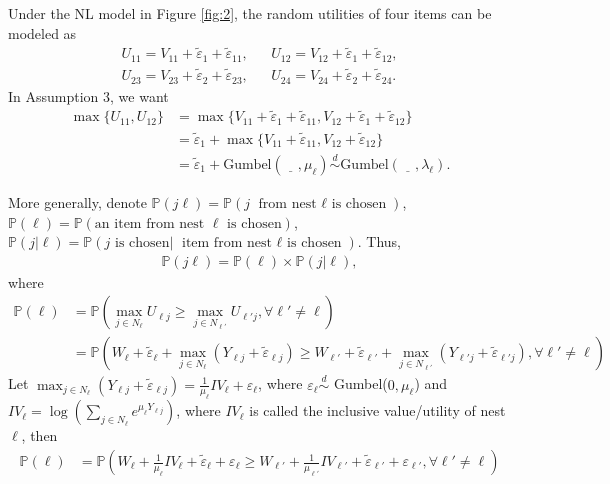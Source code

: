 \documentclass[11pt]{article}
\newcommand{\prob}{\ensuremath{\mathbb{P}}}
\newenvironment{example}[2][Example]{\begin{trivlist}
\item[\hskip \labelsep {\bfseries #1}\hskip \labelsep {\bfseries #2.}]}{\end{trivlist}}
\begin{document}
\begin{example}[Example] 4
Under the NL model in Figure \ref{fig:2}, the random utilities of four items can be modeled as
\begin{align*}
U_{11} = V_{11} + \tilde{\varepsilon}_1 + \tilde{\varepsilon}_{11}, && U_{12} = V_{12} + \tilde{\varepsilon}_1 + \tilde{\varepsilon}_{12},\\
U_{23} = V_{23} + \tilde{\varepsilon}_2 + \tilde{\varepsilon}_{23}, && U_{24} = V_{24} + \tilde{\varepsilon}_2 + \tilde{\varepsilon}_{24}.
\end{align*}
In Assumption 3, we want
\begin{align*}
\max\{U_{11}, U_{12}\} &= \max \{V_{11} + \tilde{\varepsilon}_1 + \tilde{\varepsilon}_{11}, V_{12} + \tilde{\varepsilon}_1 + \tilde{\varepsilon}_{12}\}\\
&= \tilde{\varepsilon}_1 + \max \{V_{11} + \tilde{\varepsilon}_{11}, V_{12} + \tilde{\varepsilon}_{12}\}\\
&= \tilde{\varepsilon}_1 + \text{Gumbel}(\underline{\quad}, \mu_\ell) \overset{d}\sim\text{Gumbel}(\underline{\quad}, \lambda_\ell).
\end{align*}
\end{example}
More generally, denote $\prob(j\ell) = \prob(j \text{ from nest $\ell$ is chosen})$, $\prob(\ell) = \prob(\text{an item from nest $\ell$ is chosen})$, $\prob(j|\ell) = \prob(j \text{ is chosen}|\text{ item from nest $\ell$ is chosen})$. Thus,
\begin{align*}
\prob(j \ell) = \prob(\ell) \times \prob(j|\ell),
\end{align*}
where
\begin{align*}
\prob(\ell) &= \prob(\max_{j \in N_\ell} U_{\ell j} \geq \max_{j \in N_{\ell'}} U_{\ell' j}, \forall \ell' \neq \ell)\\
&= \prob(W_\ell + \tilde{\varepsilon}_\ell + \max_{j \in N_\ell}(Y_{\ell j} + \tilde{\varepsilon}_{\ell j}) \geq W_{\ell'} + \tilde{\varepsilon}_{\ell'} + \max_{j \in N_{\ell'}}(Y_{\ell' j} + \tilde{\varepsilon}_{\ell' j}), \forall \ell' \neq \ell)
\end{align*}
Let $\max_{j \in N_\ell}(Y_{\ell j} + \tilde{\varepsilon}_{\ell j}) = \frac{1}{\mu_\ell} IV_\ell + \varepsilon_\ell$, where $\varepsilon_\ell \overset{d}\sim$ Gumbel($0, \mu_\ell$) and $IV_\ell = \log(\sum_{j \in N_\ell} e^{\mu_\ell Y_{\ell j}})$, where $IV_\ell$ is called the inclusive value/utility of nest $\ell$, then
\begin{align*}
\prob(\ell) &= \prob(W_\ell + \frac{1}{\mu_\ell} IV_\ell +\tilde{\varepsilon}_\ell + \varepsilon_\ell \geq W_{\ell'} + \frac{1}{\mu_{\ell'}} IV_{\ell'} +\tilde{\varepsilon}_{\ell'} + \varepsilon_{\ell'}, \forall \ell' \neq \ell)
\end{align*}
\end{document}
